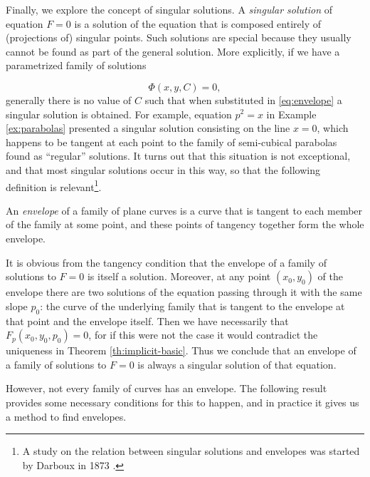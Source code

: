Finally, we explore the concept of singular solutions. A \textit{singular solution} of equation $F=0$ is a solution of the equation that is composed entirely of (projections of) singular points. Such solutions are special because they usually cannot be found as part of the general solution. More explicitly, if we have a parametrized family of solutions

\begin{equation} \label{eq:envelope}
  \Phi(x,y,C)=0,
\end{equation}
generally there is no value of $C$ such that when substituted in \eqref{eq:envelope} a singular solution is obtained. For example, equation $p^2=x$ in Example \ref{ex:parabolas} presented a singular solution consisting on the line $x=0$, which happens to be tangent at each point to the family of semi-cubical parabolas found as ``regular'' solutions. It turns out that this situation is not exceptional, and that most singular solutions occur in this way, so that the following definition is relevant\footnote{A study on the relation between singular solutions and envelopes was started by Darboux in 1873 \cite{darboux1873solutions}.}.

\begin{definition}An \textit{envelope} of a family of plane curves is a curve that is tangent to each member of the family at some point, and these points of tangency together form the whole envelope.

\end{definition}

\begin{remark} It is obvious from the tangency condition that the envelope of a family of solutions to $F=0$ is itself a solution. Moreover, at any point $(x_0,y_0)$ of the envelope there are two solutions of the equation passing through it with the same slope $p_0$: the curve of the underlying family that is tangent to the envelope at that point and the envelope itself. Then we have necessarily that $F_p(x_0,y_0,p_0)=0$, for if this were not the case it would contradict the uniqueness in Theorem \ref{th:implicit-basic}. Thus we conclude that an envelope of a family of solutions to $F=0$ is always a singular solution of that equation.
\end{remark}

However, not every family of curves has an envelope. The following result provides some necessary conditions for this to happen, and in practice it gives us a method to find envelopes.

